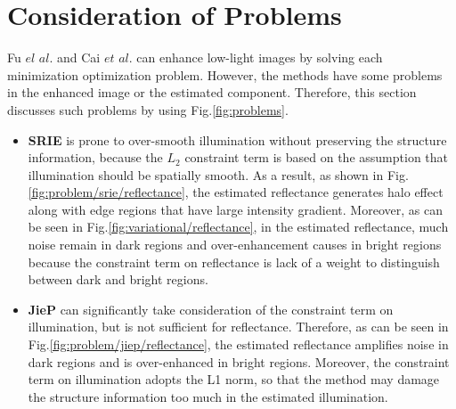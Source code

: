 \section{Consideration of Problems} \label{sec:problems}
Fu $el$ $ al.$ and Cai $et$ $al.$ can enhance low-light images by solving each minimization optimization problem.
However, the methods have some problems in the enhanced image or the estimated component.
Therefore, this section discusses such problems by using Fig.\ref{fig:problems}.
\begin{itemize}
\item \textbf{SRIE} is prone to over-smooth illumination without preserving the structure information, because the $L_{2}$ constraint term is based on the assumption that illumination should be spatially smooth. 
As a result, as shown in Fig.\ref{fig:problem/srie/reflectance}, the estimated reflectance generates halo effect along with edge regions that have large intensity gradient. 
Moreover, as can be seen in Fig.\ref{fig:variational/reflectance}, in the estimated reflectance, much noise remain in dark regions and over-enhancement causes in bright regions because the constraint term on reflectance is lack of a weight to distinguish between dark and bright regions.
\end{itemize}
\begin{itemize}
\item \textbf{JieP} can significantly take consideration of the constraint term on illumination, but is not sufficient for reflectance. Therefore, as can be seen in Fig.\ref{fig:problem/jiep/reflectance}, the estimated reflectance amplifies noise in dark regions and is over-enhanced in bright regions. Moreover, the constraint term on illumination adopts the L1 norm, so that the method may damage the structure information too much in the estimated illumination.
\end{itemize}
